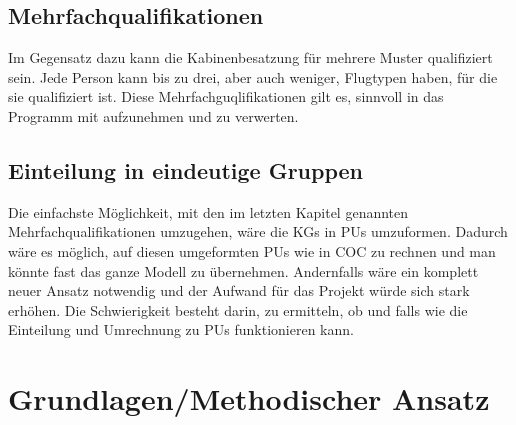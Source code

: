 \documentclass [12pt, a4paper, oneside, titlepage, ngerman]{article}
\begin{document}
\subsection{Mehrfachqualifikationen}
Im Gegensatz dazu kann die Kabinenbesatzung für mehrere Muster qualifiziert sein. Jede Person kann bis zu drei, aber auch weniger, Flugtypen haben, für die sie qualifiziert ist. Diese Mehrfachguqlifikationen gilt es, sinnvoll in das Programm mit aufzunehmen und zu verwerten.

\subsection{Einteilung in eindeutige Gruppen}
Die einfachste Möglichkeit, mit den im letzten Kapitel genannten Mehrfachqualifikationen umzugehen, wäre die \acp{KG} in \acp{PU} umzuformen. Dadurch wäre es möglich, auf diesen umgeformten \acp{PU} wie in \ac{COC} zu rechnen und man könnte fast das ganze Modell zu übernehmen. Andernfalls wäre ein komplett neuer Ansatz notwendig und der Aufwand für das Projekt würde sich stark erhöhen. Die Schwierigkeit besteht darin, zu ermitteln, ob und falls wie die Einteilung und Umrechnung zu \acp{PU} funktionieren kann.

\newpage

\section {Grundlagen/Methodischer Ansatz}
\end{document}
